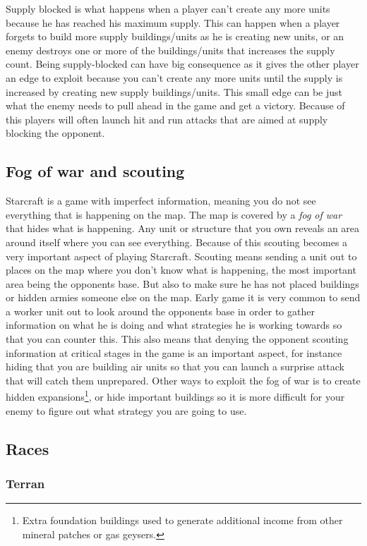 Supply blocked is what happens when a player can't create any more units because
he has reached his maximum supply. This can happen when a player forgets to
build more supply buildings/units as he is creating new units, or an enemy
destroys one or more of the buildings/units that increases the supply count.
Being supply-blocked can have big consequence as it gives the other player an
edge to exploit because you can't create any more units until the supply is
increased by creating new supply buildings/units. This small edge can be just
what the enemy needs to pull ahead in the game and get a victory. Because of
this players will often launch hit and run attacks that are aimed at supply
blocking the opponent.
 
\subsection{Fog of war and scouting}
Starcraft is a game with imperfect information, meaning you do not see
everything that is happening on the map. The map is covered by a \textit{fog
of war} that hides what is happening. Any unit or structure that you own reveals
an area around itself where you can see everything. Because of this scouting
becomes a very important aspect of playing Starcraft. Scouting means sending a
unit out to places on the map where you don't know what is happening, the most
important area being the opponents base. But also to make sure he has not placed
buildings or hidden armies someone else on the map. Early game it is very common
to send a worker unit out to look around the opponents base in order to gather
information on what he is doing and what strategies he is working towards so
that you can counter this. This also means that denying the opponent scouting
information at critical stages in the game is an important aspect, for instance
hiding that you are building air units so that you can launch a surprise attack
that will catch them unprepared. Other ways to exploit the fog of war is to
create hidden expansions\footnote{Extra foundation buildings used to generate
additional income from other mineral patches or gas geysers.}, or hide important
buildings so it is more difficult for your enemy to figure out what strategy you
are going to use. 

\subsection{Races}

\subsubsection{Terran}

